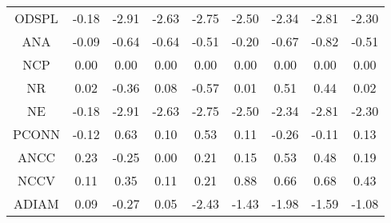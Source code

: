 \begin{longtable}{ | c || c | c | c | c | c | c | c || c |}
ODSPL &  \cellcolor[HTML]{FFF7F7} -0.18 &  \cellcolor[HTML]{FFB7B7} -2.91 &  \cellcolor[HTML]{FFBFBF} -2.63 &  \cellcolor[HTML]{FFB7B7} -2.75 &  \cellcolor[HTML]{FFBFBF} -2.50 &  \cellcolor[HTML]{FFC7C7} -2.34 &  \cellcolor[HTML]{FFB7B7} -2.81 &  \cellcolor[HTML]{FFC7C7} -2.30 \\
ANA &  \cellcolor[HTML]{FFFFFF} -0.09 &  \cellcolor[HTML]{FFEFEF} -0.64 &  \cellcolor[HTML]{FFEFEF} -0.64 &  \cellcolor[HTML]{FFEFEF} -0.51 &  \cellcolor[HTML]{FFF7F7} -0.20 &  \cellcolor[HTML]{FFEFEF} -0.67 &  \cellcolor[HTML]{FFE7E7} -0.82 &  \cellcolor[HTML]{FFEFEF} -0.51 \\
NCP &  \cellcolor[HTML]{FFFFFF} 0.00 &  \cellcolor[HTML]{FFFFFF} 0.00 &  \cellcolor[HTML]{FFFFFF} 0.00 &  \cellcolor[HTML]{FFFFFF} 0.00 &  \cellcolor[HTML]{FFFFFF} 0.00 &  \cellcolor[HTML]{FFFFFF} 0.00 &  \cellcolor[HTML]{FFFFFF} 0.00 &  \cellcolor[HTML]{FFFFFF} 0.00 \\
NR &  \cellcolor[HTML]{FFFFFF} 0.02 &  \cellcolor[HTML]{FFF7F7} -0.36 &  \cellcolor[HTML]{FFFFFF} 0.08 &  \cellcolor[HTML]{FFEFEF} -0.57 &  \cellcolor[HTML]{FFFFFF} 0.01 &  \cellcolor[HTML]{EFEFFF} 0.51 &  \cellcolor[HTML]{F7F7FF} 0.44 &  \cellcolor[HTML]{FFFFFF} 0.02 \\
NE &  \cellcolor[HTML]{FFF7F7} -0.18 &  \cellcolor[HTML]{FFB7B7} -2.91 &  \cellcolor[HTML]{FFBFBF} -2.63 &  \cellcolor[HTML]{FFB7B7} -2.75 &  \cellcolor[HTML]{FFBFBF} -2.50 &  \cellcolor[HTML]{FFC7C7} -2.34 &  \cellcolor[HTML]{FFB7B7} -2.81 &  \cellcolor[HTML]{FFC7C7} -2.30 \\
PCONN &  \cellcolor[HTML]{FFFFFF} -0.12 &  \cellcolor[HTML]{EFEFFF} 0.63 &  \cellcolor[HTML]{FFFFFF} 0.10 &  \cellcolor[HTML]{EFEFFF} 0.53 &  \cellcolor[HTML]{FFFFFF} 0.11 &  \cellcolor[HTML]{FFF7F7} -0.26 &  \cellcolor[HTML]{FFFFFF} -0.11 &  \cellcolor[HTML]{FFFFFF} 0.13 \\
ANCC &  \cellcolor[HTML]{F7F7FF} 0.23 &  \cellcolor[HTML]{FFF7F7} -0.25 &  \cellcolor[HTML]{FFFFFF} 0.00 &  \cellcolor[HTML]{F7F7FF} 0.21 &  \cellcolor[HTML]{FFFFFF} 0.15 &  \cellcolor[HTML]{EFEFFF} 0.53 &  \cellcolor[HTML]{EFEFFF} 0.48 &  \cellcolor[HTML]{F7F7FF} 0.19 \\
NCCV &  \cellcolor[HTML]{FFFFFF} 0.11 &  \cellcolor[HTML]{F7F7FF} 0.35 &  \cellcolor[HTML]{FFFFFF} 0.11 &  \cellcolor[HTML]{F7F7FF} 0.21 &  \cellcolor[HTML]{E7E7FF} 0.88 &  \cellcolor[HTML]{EFEFFF} 0.66 &  \cellcolor[HTML]{EFEFFF} 0.68 &  \cellcolor[HTML]{F7F7FF} 0.43 \\
ADIAM &  \cellcolor[HTML]{FFFFFF} 0.09 &  \cellcolor[HTML]{FFF7F7} -0.27 &  \cellcolor[HTML]{FFFFFF} 0.05 &  \cellcolor[HTML]{FFBFBF} -2.43 &  \cellcolor[HTML]{FFDFDF} -1.43 &  \cellcolor[HTML]{FFCFCF} -1.98 &  \cellcolor[HTML]{FFD7D7} -1.59 &  \cellcolor[HTML]{FFE7E7} -1.08 \\

\end{longtable}
